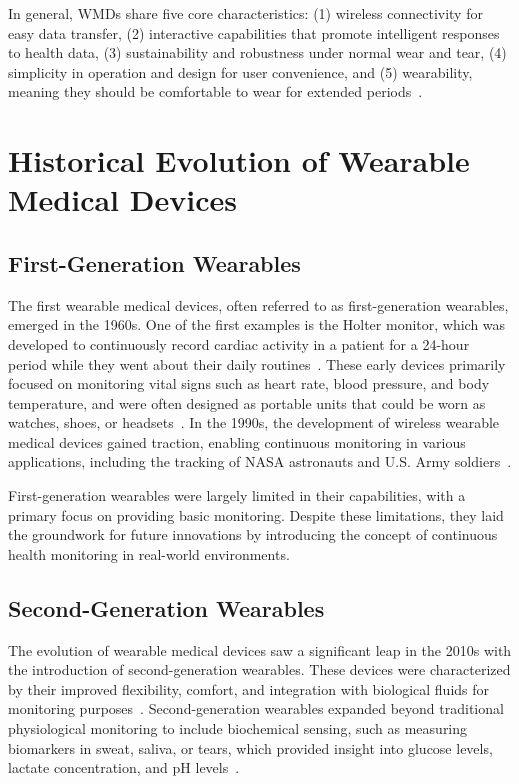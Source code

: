 \documentclass[journal]{IEEEtran}
\begin{document}
    In general, WMDs share five core characteristics: (1) wireless connectivity for easy data transfer, (2) interactive capabilities that promote intelligent responses to health data, (3) sustainability and robustness under normal wear and tear, (4) simplicity in operation and design for user convenience, and (5) wearability, meaning they should be comfortable to wear for extended periods~\cite{Lu2020}.

\section{Historical Evolution of Wearable Medical Devices}
\label{3.Historical}
    \subsection{First-Generation Wearables}

    The first wearable medical devices, often referred to as first-generation wearables, emerged in the 1960s. One of the first examples is the Holter monitor, which was developed to continuously record cardiac activity in a patient for a 24-hour period while they went about their daily routines~\cite{Ates2022}. These early devices primarily focused on monitoring vital signs such as heart rate, blood pressure, and body temperature, and were often designed as portable units that could be worn as watches, shoes, or headsets~\cite{Fotiadis2006}. In the 1990s, the development of wireless wearable medical devices gained traction, enabling continuous monitoring in various applications, including the tracking of NASA astronauts and U.S. Army soldiers~\cite{Luo2024}.

    First-generation wearables were largely limited in their capabilities, with a primary focus on providing basic monitoring. Despite these limitations, they laid the groundwork for future innovations by introducing the concept of continuous health monitoring in real-world environments.

    \subsection{Second-Generation Wearables}
    
    The evolution of wearable medical devices saw a significant leap in the 2010s with the introduction of second-generation wearables. These devices were characterized by their improved flexibility, comfort, and integration with biological fluids for monitoring purposes~\cite{Ates2022}. Second-generation wearables expanded beyond traditional physiological monitoring to include biochemical sensing, such as measuring biomarkers in sweat, saliva, or tears, which provided insight into glucose levels, lactate concentration, and pH levels~\cite{Luo2024}.
\end{document}
